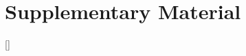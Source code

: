 \documentclass[sigconf,nonacm,balance=false]{aamas}
\begin{document}
\clearpage
\appendix
\setcounter{table}{0}
\setcounter{figure}{0}
\renewcommand{\thetable}{S\arabic{table}}
\renewcommand{\thefigure}{S\arabic{figure}}
\renewcommand{\theHtable}{supp.\arabic{table}}
\renewcommand{\theHfigure}{supp.\arabic{figure}}
\providecommand{\tabnote}[1]{\par\vspace{3pt}\begin{minipage}{\linewidth}\footnotesize\setlength{\parindent}{0pt}#1\par\end{minipage}}
\renewcommand{\topfraction}{0.9}
\renewcommand{\dbltopfraction}{0.9}
\renewcommand{\textfraction}{0.07}
\renewcommand{\floatpagefraction}{0.8}
\renewcommand{\dblfloatpagefraction}{0.8}
\setcounter{topnumber}{3}
\setcounter{dbltopnumber}{3}
\setcounter{totalnumber}{4}
\section*{Supplementary Material}
[]
\SupplementBody
\end{document}
